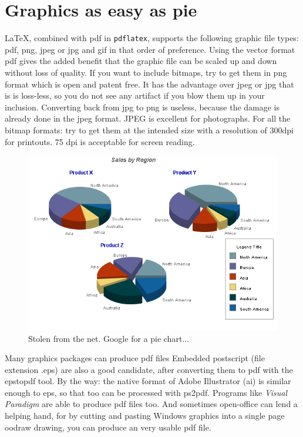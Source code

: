 \renewcommand\TheFile{ch04_graphics.tex}

\chapter{Graphics as easy as pie}
\LaTeX, combined with pdf in \texttt{pdflatex}, supports the following
graphic file types: pdf, png, jpeg or jpg and gif in that order of
preference. Using the vector format pdf gives the added benefit that
the graphic file can be scaled up and down without loss of quality.
If you want to include bitmaps, try to get them in png format which
is open and patent free. It has the advantage over jpeg or jpg that is is
loss-less, so you do not see any artifact if you blow them up in your
inclusion. Converting back from jpg to png is useless, because the
damage is already done in the jpeg format. JPEG is excellent for
photographs. For all the bitmap formats: try to get them at the
intended size with a resolution of 300dpi for printouts. 75 dpi is
acceptable for screen reading.
  
\begin{figure}[thbp]
  \centering
  \includegraphics[width=.8\textwidth]{images/servlet3.png}
  \caption[A Pie chart]{Stolen from the net. Google for a pie chart...}
  \label{fig:pie}
\end{figure}

Many graphics packages can produce pdf files
Embedded postscript (file extension .eps) are also a good candidate,
after converting them to pdf with the epstopdf tool. By the way: the
native format of Adobe Illustrator (ai) is similar enough to eps, so
that too can be processed with ps2pdf. Programs like {\em Visual
  Paradigm} are able to produce pdf files too. And sometimes open-office can
lend a helping hand, for by cutting and pasting Windows graphics into
a single page oodraw drawing, you can produce an very usable pdf file. 

